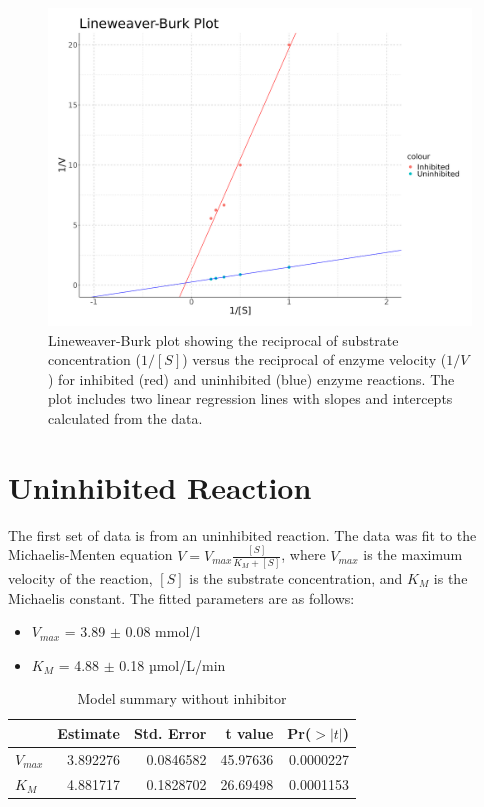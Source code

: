 \documentclass{article}
\begin{document}
\begin{figure}[H]
    \centering
    \includegraphics[width=1.0\textwidth, height=0.5\textheight]{plots/Lineweaver-Burk_big.png}
    \caption{Lineweaver-Burk plot showing the reciprocal of substrate concentration
    ($1/[S]$) versus the reciprocal of enzyme velocity ($1/V$) for inhibited (red) and
    uninhibited (blue) enzyme reactions. The plot includes two linear regression lines with
    slopes and intercepts calculated from the data.}

    \label{fig:lineweaver-burk}
\end{figure}

\section{Uninhibited Reaction}

The first set of data is from an uninhibited reaction. The data was fit to the
Michaelis-Menten equation $V = V_{max} \displaystyle \frac{[S]}{K_{M} + [S]}$, where $V_{max}$ is the
maximum velocity of the reaction, $[S]$ is the substrate concentration, and $K_{M}$ is the
Michaelis constant. The fitted parameters are as follows:
\begin{itemize}
    \item $V_{max}$ = 3.89 $\pm$ 0.08 mmol/l
    \item $K_{M}$ = 4.88 $\pm$ 0.18 µmol/L/min
\end{itemize}

\begin{table}[H]
    \caption{Model summary without inhibitor}
    \centering
    \begin{tabular}[t]{l|r|r|r|r}
        \hline
                  & Estimate & Std. Error & t value  & Pr($>|t|$) \\
        \hline
        $V_{max}$ & 3.892276 & 0.0846582  & 45.97636 & 0.0000227  \\
        \hline
        $K_{M}$   & 4.881717 & 0.1828702  & 26.69498 & 0.0001153  \\
        \hline
    \end{tabular}
\end{table}
\end{document}
